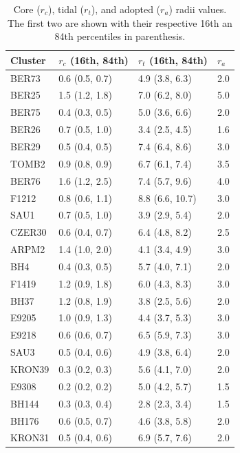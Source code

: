 \documentclass{aa}
\begin{document}
  \begin{table}
  \caption{Core ($r_{c}$), tidal ($r_{t}$), and adopted ($r_{a}$) radii values.
  The first two are shown with their respective 16th an 84th percentiles in
  parenthesis.}
  \label{tab:radii}
  \centering
  \begin{tabular}{llll}
  \hline\hline
  Cluster & $r_{c}$ (16th, 84th) &  $r_{t}$ (16th, 84th) & $r_{a}$\\
  \hline
   BER73         & 0.6 (0.5, 0.7) &  4.9 (3.8, 6.3) &  2.0\\
   BER25         & 1.5 (1.2, 1.8) &  7.0 (6.2, 8.0) &  5.0\\
   BER75         & 0.4 (0.3, 0.5) &  5.0 (3.6, 6.6) &  2.0\\
   BER26         & 0.7 (0.5, 1.0) &  3.4 (2.5, 4.5) &  1.6\\
   BER29         & 0.5 (0.4, 0.5) &  7.4 (6.4, 8.6) &  3.0\\
   TOMB2         & 0.9 (0.8, 0.9) &  6.7 (6.1, 7.4) &  3.5\\
   BER76         & 1.6 (1.2, 2.5) &  7.4 (5.7, 9.6) &  4.0\\
   F1212         & 0.8 (0.6, 1.1) &  8.8 (6.6, 10.7) & 3.0\\
   SAU1          & 0.7 (0.5, 1.0) &  3.9 (2.9, 5.4) &  2.0\\
   CZER30        & 0.6 (0.4, 0.7) &  6.4 (4.8, 8.2) &  2.5\\
   ARPM2         & 1.4 (1.0, 2.0) &  4.1 (3.4, 4.9) &  3.0\\
   BH4           & 0.4 (0.3, 0.5) &  5.7 (4.0, 7.1) &  2.0\\
   F1419         & 1.2 (0.9, 1.8) &  6.0 (4.3, 8.3) &  3.0\\
   BH37          & 1.2 (0.8, 1.9) &  3.8 (2.5, 5.6) &  2.0\\
   E9205         & 1.0 (0.9, 1.3) &  4.4 (3.7, 5.3) &  3.0\\
   E9218         & 0.6 (0.6, 0.7) &  6.5 (5.9, 7.3) &  3.0\\
   SAU3          & 0.5 (0.4, 0.6) &  4.9 (3.8, 6.4) &  2.0\\
   KRON39        & 0.3 (0.2, 0.3) &  5.6 (4.1, 7.0) &  2.0\\
   E9308         & 0.2 (0.2, 0.2) &  5.0 (4.2, 5.7) &  1.5\\
   BH144         & 0.3 (0.3, 0.4) &  2.8 (2.3, 3.4) &  1.5\\
   BH176         & 0.6 (0.5, 0.7) &  4.6 (3.8, 5.8) &  2.0\\
   KRON31        & 0.5 (0.4, 0.6) &  6.9 (5.7, 7.6) &  2.0\\

\end{tabular}
\end{table}
\end{document}
